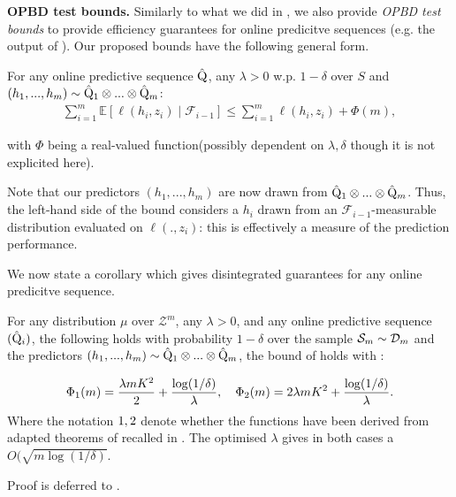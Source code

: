 \textbf{OPBD test bounds.}
Similarly to what we did in , we also provide \emph{OPBD test bounds} to provide efficiency guarantees for online predicitve sequences (e.g. the output of ). Our proposed bounds have the following general form.

For any online predictive sequence $\hat{\mathrm{Q}}$, any $\lambda>0$ w.p. $1-\delta$ over $S$ and $(h_1,...,h_{m})\sim \hat{\mathrm{Q}}_1\otimes...\otimes \hat{\mathrm{Q}}_{m}$:
\begin{align}
  \label{eq: OPBD_test_bound}
  \sum_{i=1}^m  \mathbb{E}[\ell(h_i,z_i) \mid \mathcal{F}_{i-1}]   \leq \sum_{i=1}^m  \ell(h_i,z_i)   + \Phi(m),
\end{align}

with $\Phi$ being a real-valued function(possibly dependent on $\lambda,\delta$ though it is not explicited here).

Note that our predictors $(h_1,...,h_m)$ are now drawn from $\hat{\mathrm{Q}}_1\otimes...\otimes \hat{\mathrm{Q}}_{m}$. Thus, the left-hand side of the bound considers a $h_i$ drawn from an $\mathcal{F}_{i-1}$-measurable distribution evaluated on $\ell(.,z_i)$: this is effectively a measure of the prediction performance.

We now state a corollary which gives disintegrated guarantees for any online predicitve sequence.

\begin{corollary}
  \label{cor: OPBD_test_bound}
  For any distribution $\mu$ over $\mathcal{Z}^m$, any $\lambda>0$, and any online predictive sequence $(\hat{\mathrm{Q}}_i)$, the following holds with probability $1-\delta$ over the sample $\mathcal{S}_m\sim\mathcal{D}_{m}$ and the predictors $(h_1,...,h_m)\sim \hat{\mathrm{Q}}_1\otimes...\otimes \hat{\mathrm{Q}}_m$, the bound of  holds with  :

  \begin{align*}
    \Phi_{\normalfont1}(m)= \frac{\lambda m K^2}{2} + \frac{\log(1/\delta)}{\lambda}, \quad \Phi_{\normalfont2}(m) = 2\lambda m K^2 + \frac{\log(1/\delta)}{\lambda}.
  \end{align*}
  Where the notation $\normalfont1, \normalfont2$ denote whether the functions have been derived from adapted theorems of \citealp{rivasplata2020pac,viallard2023general} recalled in . The optimised $\lambda$ gives in both cases a $O(\sqrt{m\log(1/\delta)}$.
\end{corollary}

 Proof is deferred to .

